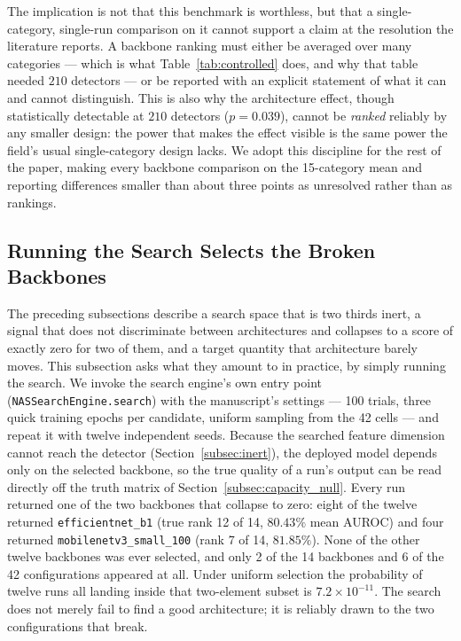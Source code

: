 The implication is not that this benchmark is worthless, but that a
single-category, single-run comparison on it cannot support a claim at the
resolution the literature reports. A backbone ranking must either be averaged over
many categories --- which is what Table~\ref{tab:controlled} does, and why that
table needed $210$ detectors --- or be reported with an explicit statement of what
it can and cannot distinguish. This is also why the architecture effect, though
statistically detectable at $210$ detectors ($p = 0.039$), cannot be
\emph{ranked} reliably by any smaller design: the power that makes the effect
visible is the same power the field's usual single-category design lacks. We adopt
this discipline for the rest of the paper, making every backbone comparison on the
15-category mean and reporting differences smaller than about three points as
unresolved rather than as rankings.

\subsection{Running the Search Selects the Broken Backbones}
\label{subsec:search_vs_random}

The preceding subsections describe a search space that is two thirds inert, a
signal that does not discriminate between architectures and collapses to a score
of exactly zero for two of them, and a target quantity that architecture barely
moves. This subsection asks what they amount to in practice, by simply running the
search. We invoke the search engine's own entry point
(\texttt{NASSearchEngine.search}) with the manuscript's settings --- 100 trials,
three quick training epochs per candidate, uniform sampling from the 42 cells ---
and repeat it with twelve independent seeds. Because the searched feature
dimension cannot reach the detector (Section~\ref{subsec:inert}), the deployed
model depends only on the selected backbone, so the true quality of a run's output
can be read directly off the truth matrix of
Section~\ref{subsec:capacity_null}. Every run returned one of the two backbones
that collapse to zero: eight of the twelve returned \texttt{efficientnet\_b1}
(true rank 12 of 14, $80.43\%$ mean AUROC) and four returned
\texttt{mobilenetv3\_small\_100} (rank 7 of 14, $81.85\%$). None of the other
twelve backbones was ever selected, and only 2 of the 14 backbones and 6 of the 42
configurations appeared at all. Under uniform selection the probability of twelve
runs all landing inside that two-element subset is $7.2\times10^{-11}$. The search
does not merely fail to find a good architecture; it is reliably drawn to the two
configurations that break.

